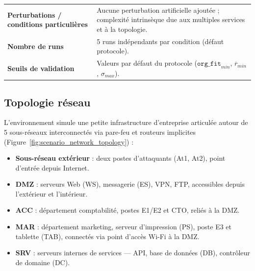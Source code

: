 \begin{table}[h!]
{\begin{tabular}{p{5cm}p{8.5cm}}
      \textbf{Perturbations / conditions particulières} & Aucune perturbation artificielle ajoutée ; complexité intrinsèque due aux multiples services et à la topologie.                                                                                                                                                                                                                                                  \\

      \textbf{Nombre de runs}                           & 5 runs indépendants par condition (défaut protocole).                                                                                                                                                                                                                                                                                                            \\

      \textbf{Seuils de validation}                     & Valeurs par défaut du protocole (\(\texttt{org\_fit}_{min}\), \(\overline{r}_{min}\), \(\sigma_{max}\)).                                                                                                                                                                                                                                                         \\
      \hline
    \end{tabular}
  }
\end{table}

\subsection{Topologie réseau}
\label{subsec:enterprise_topology}
L’environnement simule une petite infrastructure d’entreprise articulée autour de 5 sous-réseaux interconnectés via pare-feu et routeurs implicites (Figure~\ref{fig:scenario_network_topology}) :
\begin{itemize}
  \item \textbf{Sous-réseau extérieur} : deux postes d’attaquants (At1, At2), point d’entrée depuis Internet.
  \item \textbf{DMZ} : serveurs Web (WS), messagerie (ES), VPN, FTP, accessibles depuis l’extérieur et l’intérieur.
  \item \textbf{ACC} : département comptabilité, postes E1/E2 et CTO, reliés à la DMZ.
  \item \textbf{MAR} : département marketing, serveur d’impression (PS), poste E3 et tablette (TAB), connectés via point d’accès Wi-Fi à la DMZ.
  \item \textbf{SRV} : serveurs internes de services — API, base de données (DB), contrôleur de domaine (DC).
\end{itemize}

